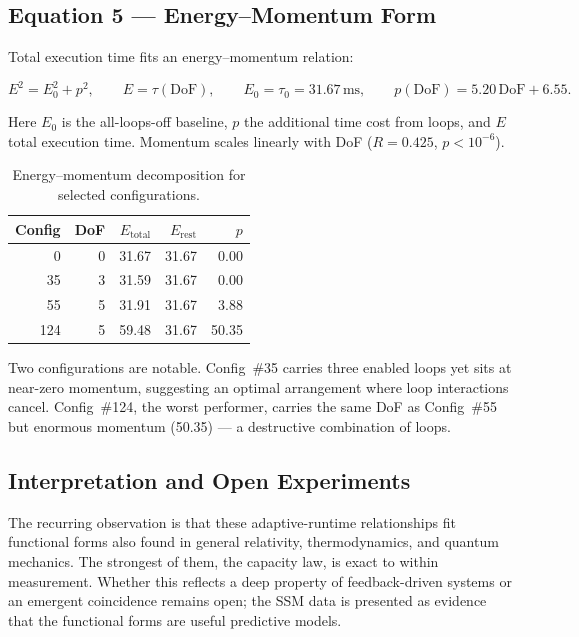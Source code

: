 \subsection{Equation 5 --- Energy--Momentum Form}

Total execution time fits an energy--momentum relation:

\begin{equation}
E^2 = E_0^2 + p^2,
\qquad E = \tau(\mathrm{DoF}),
\qquad E_0 = \tau_0 = 31.67\,\mathrm{ms},
\qquad p(\mathrm{DoF}) = 5.20\,\mathrm{DoF} + 6.55.
\end{equation}

Here $E_0$ is the all-loops-off baseline, $p$ the additional time cost from
loops, and $E$ total execution time. Momentum scales linearly with DoF
($R = 0.425$, $p < 10^{-6}$).

\begin{table}[ht]
\centering
\small
\begin{tabular}{rrrrr}
\toprule
Config & DoF & $E_{\text{total}}$ & $E_{\text{rest}}$ & $p$ \\
\midrule
0   & 0 & 31.67 & 31.67 & 0.00 \\
35  & 3 & 31.59 & 31.67 & 0.00 \\
55  & 5 & 31.91 & 31.67 & 3.88 \\
124 & 5 & 59.48 & 31.67 & 50.35 \\
\bottomrule
\end{tabular}
\caption{Energy--momentum decomposition for selected configurations.}
\end{table}

Two configurations are notable. Config~\#35 carries three enabled loops yet sits
at near-zero momentum, suggesting an optimal arrangement where loop interactions
cancel. Config~\#124, the worst performer, carries the same DoF as Config~\#55
but enormous momentum (50.35) --- a destructive combination of loops.

\subsection{Interpretation and Open Experiments}

The recurring observation is that these adaptive-runtime relationships fit
functional forms also found in general relativity, thermodynamics, and quantum
mechanics. The strongest of them, the capacity law, is exact to within
measurement. Whether this reflects a deep property of feedback-driven systems or
an emergent coincidence remains open; the SSM data is presented as evidence that
the functional forms are useful predictive models.


